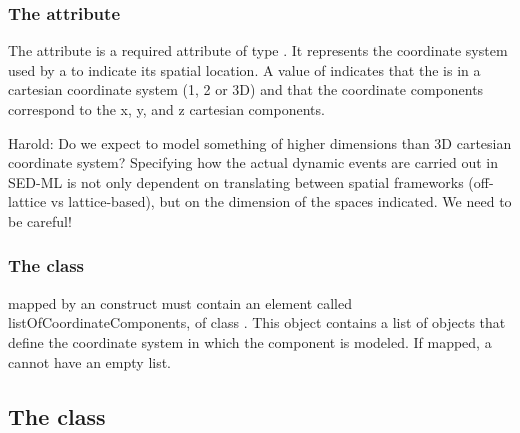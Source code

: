 \subsubsection{The  attribute}
\label{attr:coordSystem}

The  attribute is a required attribute of type . It represents the coordinate system used by a \Compartment to indicate its spatial location. A value of  indicates that the \Compartment is in a cartesian coordinate system (1, 2 or 3D) and that the coordinate components correspond to the x, y, and z cartesian components.


{\color{red} Harold: \notice  Do we expect to model something of higher dimensions than 3D cartesian coordinate system? Specifying how the actual dynamic events are carried out in SED-ML is not only dependent on translating between spatial frameworks (off-lattice vs lattice-based), but on the dimension of the spaces indicated. We need to be careful!}

\subsubsection{The  class}
\label{subsec:listCoordComp}

\Compartments mapped by an \EventAssignment construct must contain an element called listOfCoordinateComponents, of class \ListOfCoordinateComponents. This object contains a list of \CoordinateComponent objects that define the coordinate system in which the component is modeled. If mapped, a \Compartment cannot have an empty \ListOfCoordinateComponents list.

\subsection{The  class}
\label{subsec:coordComp}

